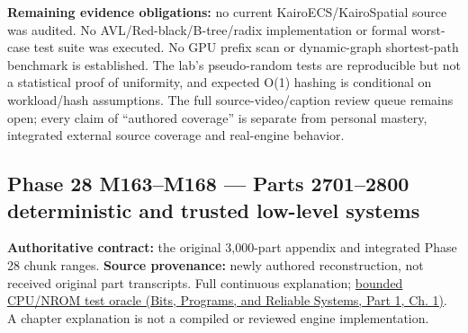 \textbf{Remaining evidence obligations:} no current KairoECS/KairoSpatial source was audited. No AVL/Red-black/B-tree/radix implementation or formal worst-case test suite was executed. No GPU prefix scan or dynamic-graph shortest-path benchmark is established. The lab's pseudo-random tests are reproducible but not a statistical proof of uniformity, and expected O(1) hashing is conditional on workload/hash assumptions. The full source-video/caption review queue remains open; every claim of ``authored coverage'' is separate from personal mastery, integrated external source coverage and real-engine behavior.

\subsection{Phase 28 M163--M168 --- Parts 2701--2800 deterministic and trusted low-level systems}\label{appendix-fd090d982a15-phase-28-m163m168-parts-27012800-deterministic-and-trusted-low-level-systems}

\hypertarget{appendix-fd090d982a15-phase-28-m163m168-parts-27012800-deterministic-and-trusted-low-level-systems}{}

\textbf{Authoritative contract:} the original 3,000-part appendix and integrated Phase 28 chunk ranges. \textbf{Source provenance:} newly authored reconstruction, not received original part transcripts. {Full continuous explanation}; \href{../01-Bits-Programs-and-Reliable-Systems-P01/main.pdf\#nameddest=source-file-552a9e2296dc984412c8f06d}{bounded CPU/NROM test oracle (Bits, Programs, and Reliable Systems, Part 1, Ch. 1)}. A chapter explanation is not a compiled or reviewed engine implementation.

